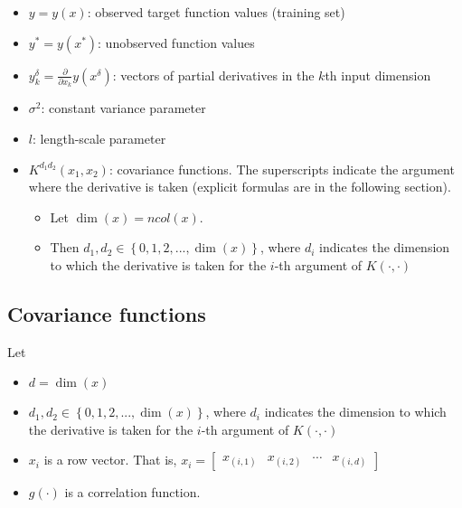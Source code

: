 \documentclass[12pt]{amsart}
\begin{document}
    \begin{itemize}
        \item $y = y(x)$: observed target function values (training set) 
        \item $y^* = y(x^*)$: unobserved function values
        \item $y_k^\delta = \frac{\partial }{{\partial {x_k}}}y\left( {{x^\delta }} \right)$: vectors of partial derivatives in the $k$th input dimension
        \item $\sigma^2$: constant variance parameter
        \item $l$: length-scale parameter
        \item $K^{d_1 d_2}(x_1, x_2)$: covariance functions. The superscripts indicate the argument where the derivative is taken (explicit formulas  are in the following section). 
        \begin{itemize}
            \item Let $\dim(x) = ncol(x)$. 
            \item Then $d_1, d_2 \in \left\{ {0,1,2,...,\dim \left( x \right)} \right\}$, where $d_i$ indicates the dimension to which the derivative is taken for the $i$-th argument of $K(\cdot, \cdot)$
        \end{itemize}

    \end{itemize}

\pagebreak

\subsection{Covariance functions}

Let 
\begin{itemize}
  \item $d = \dim(x)$
  \item $d_1, d_2 \in \left\{ {0,1,2,...,\dim \left( x \right)} \right\}$, where $d_i$ indicates the dimension to which the derivative is taken for the $i$-th argument of $K(\cdot, \cdot)$
  \item $x_i$ is a row vector. That is,  
  ${x_i} = \left[ {\begin{array}{*{20}{c}}
{{x_{\left( {i,1} \right)}}}&{{x_{\left( {i,2} \right)}}}& \cdots &{{x_{\left( {i,d} \right)}}}
\end{array}} \right]$ 
  \item $g(\cdot)$ is a correlation function. 
\end{itemize}
\end{document}
